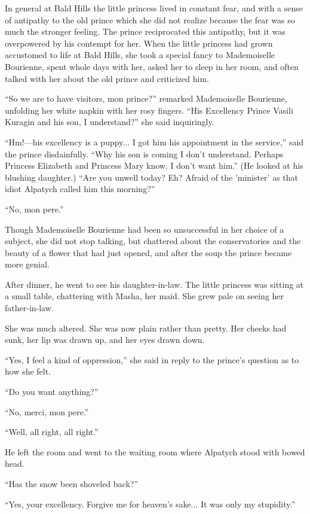 In general at Bald Hills the little princess lived in constant
fear, and with a sense of antipathy to the old prince which she
did not realize because the fear was so much the stronger
feeling. The prince reciprocated this antipathy, but it was
overpowered by his contempt for her. When the little princess had
grown accustomed to life at Bald Hills, she took a special fancy
to Mademoiselle Bourienne, spent whole days with her, asked her
to sleep in her room, and often talked with her about the old
prince and criticized him.

``So we are to have visitors, mon prince?'' remarked Mademoiselle
Bourienne, unfolding her white napkin with her rosy
fingers. ``His Excellency Prince Vasili Kuragin and his son, I
understand?'' she said inquiringly.

``Hm!---his excellency is a puppy... I got him his appointment in
the service,'' said the prince disdainfully. ``Why his son is
coming I don't understand. Perhaps Princess Elizabeth and
Princess Mary know. I don't want him.'' (He looked at his
blushing daughter.) ``Are you unwell today?  Eh? Afraid of the
'minister' as that idiot Alpatych called him this morning?''

``No, mon pere.''

Though Mademoiselle Bourienne had been so unsuccessful in her
choice of a subject, she did not stop talking, but chattered
about the conservatories and the beauty of a flower that had just
opened, and after the soup the prince became more genial.

After dinner, he went to see his daughter-in-law. The little
princess was sitting at a small table, chattering with Masha, her
maid. She grew pale on seeing her father-in-law.

She was much altered. She was now plain rather than pretty. Her
cheeks had sunk, her lip was drawn up, and her eyes drawn down.

``Yes, I feel a kind of oppression,'' she said in reply to the
prince's question as to how she felt.

``Do you want anything?''

``No, merci, mon pere.''

``Well, all right, all right.''

He left the room and went to the waiting room where Alpatych
stood with bowed head.

``Has the snow been shoveled back?''

``Yes, your excellency. Forgive me for heaven's sake... It was
only my stupidity.''

